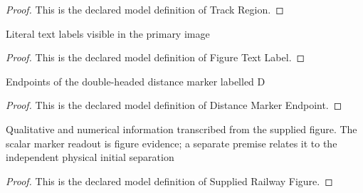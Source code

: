 \begin{proof}
  This is the declared model definition of Track Region.
\end{proof}
\begin{definition}
  \label{def:physics:phyx-mini-0730:phyxminiproblems-problemphyxmini0730-figuretextlabel}
  Literal text labels visible in the primary image
\end{definition}
\begin{proof}
  This is the declared model definition of Figure Text Label.
\end{proof}
\begin{definition}
  \label{def:physics:phyx-mini-0730:phyxminiproblems-problemphyxmini0730-distancemarkerendpoint}
  Endpoints of the double-headed distance marker labelled D
\end{definition}
\begin{proof}
  This is the declared model definition of Distance Marker Endpoint.
\end{proof}
\begin{definition}
  \label{def:physics:phyx-mini-0730:phyxminiproblems-problemphyxmini0730-suppliedrailwayfigure}
  Qualitative and numerical information transcribed from the supplied figure. The scalar marker readout is figure evidence; a separate premise relates it to the independent physical initial separation
\end{definition}
\begin{proof}
  This is the declared model definition of Supplied Railway Figure.
\end{proof}
